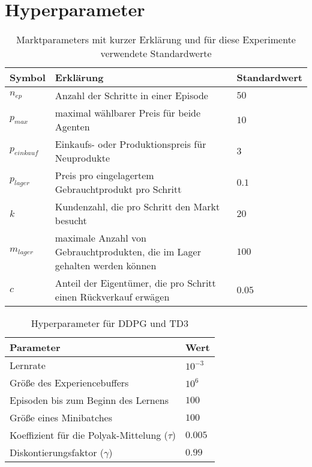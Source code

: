 \section{Hyperparameter}
\begin{table}[t]
    \centering
    \begin{tabular}{l p{}>{\bfseries}l}
        \toprule
        Symbol        & Erklärung                                                                   & Standardwert\\\midrule
        $n_{ep}$      & Anzahl der Schritte in einer Episode                                        & $50$\\
        $p_{max}$     & maximal wählbarer Preis für beide Agenten                                   & $10$\\
        $p_{einkauf}$ & Einkaufs- oder Produktionspreis für Neuprodukte                             & $3$\\
        $p_{lager}$   & Preis pro eingelagertem Gebrauchtprodukt pro Schritt                        & $0.1$\\
        $k$           & Kundenzahl, die pro Schritt den Markt besucht                               & $20$\\
        $m_{lager}$   & maximale Anzahl von Gebrauchtprodukten, die im Lager gehalten werden können & $100$\\
        $c$           & Anteil der Eigentümer, die pro Schritt einen Rückverkauf erwägen            & $0.05$\\\bottomrule
    \end{tabular}
    \caption{Marktparameters mit kurzer Erklärung und für diese Experimente verwendete Standardwerte}
    \label{tab:default_parameters}
\end{table}

\begin{table}[t]
    \centering
    \begin{tabular}{p{} l}
        \toprule
        Parameter                                     & Wert\\\midrule
        Lernrate                                      & $10^{-3}$\\
        Größe des Experiencebuffers                   & $10^6$\\
        Episoden bis zum Beginn des Lernens           & $100$\\
        Größe eines Minibatches                       & $100$\\
        Koeffizient für die Polyak-Mittelung ($\tau$) & $0.005$\\
        Diskontierungsfaktor ($\gamma$)               & $0.99$\\\bottomrule
    \end{tabular}
    \caption{Hyperparameter für DDPG und TD3}
    \label{tab:DDPGHyperparameters}
\end{table}

